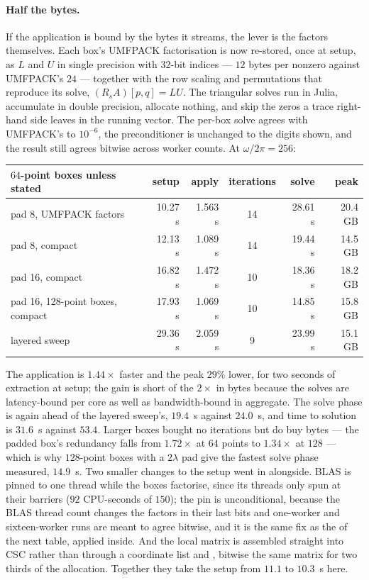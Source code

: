 \documentclass[11pt]{article}
\begin{document}
\paragraph{Half the bytes.} If the application is bound by the bytes it streams, the
lever is the factors themselves. Each box's UMFPACK factorisation is now re-stored, once
at setup, as $L$ and $U$ in single precision with 32-bit indices --- $12$ bytes per
nonzero against UMFPACK's $24$ --- together with the row scaling and permutations that
reproduce its solve, $(R_sA)[p,q]=LU$. The triangular solves run in Julia, accumulate in
double precision, allocate nothing, and skip the zeros a trace right-hand side leaves in
the running vector. The per-box solve agrees with UMFPACK's to $10^{-6}$, the
preconditioner is unchanged to the digits shown, and the result still agrees bitwise
across worker counts. At $\omega/2\pi=256$:
\begin{center}\footnotesize\setlength{\tabcolsep}{5pt}
\begin{tabular}{lrrcrr}
\toprule
$64$-point boxes unless stated & setup & apply & iterations & solve & peak \\
\midrule
pad 8, UMFPACK factors           & 10.27 s & 1.563 s & 14 & 28.61 s & 20.4 GB \\
pad 8, compact                   & 12.13 s & 1.089 s & 14 & 19.44 s & 14.5 GB \\
pad 16, compact                  & 16.82 s & 1.472 s & 10 & 18.36 s & 18.2 GB \\
pad 16, 128-point boxes, compact & 17.93 s & 1.069 s & 10 & 14.85 s & 15.8 GB \\
layered sweep                    & 29.36 s & 2.059 s &  9 & 23.99 s & 15.1 GB \\
\bottomrule
\end{tabular}
\end{center}
The application is $1.44\times$ faster and the peak $29\%$ lower, for two seconds of
extraction at setup; the gain is short of the $2\times$ in bytes because the solves are
latency-bound per core as well as bandwidth-bound in aggregate. The solve phase is again
ahead of the layered sweep's, $19.4$~s against $24.0$~s, and time to solution is $31.6$~s
against $53.4$. Larger boxes bought no iterations but do buy bytes --- the padded box's
redundancy falls from $1.72\times$ at $64$ points to $1.34\times$ at $128$ --- which is
why $128$-point boxes with a $2\lambda$ pad give the fastest solve phase measured,
$14.9$~s. Two smaller changes to the setup went in alongside. BLAS is pinned to one
thread while the boxes factorise, since its threads only spun at their barriers ($92$
CPU-seconds of $150$); the pin is unconditional, because the BLAS thread count changes the
factors in their last bits and one-worker and sixteen-worker runs are meant to agree
bitwise, and it is the same fix as the  of the next table,
applied inside. And the local matrix is assembled straight into CSC rather than through a
coordinate list and , bitwise the same matrix for two thirds of the
allocation. Together they take the setup from $11.1$ to $10.3$~s here.
\end{document}
